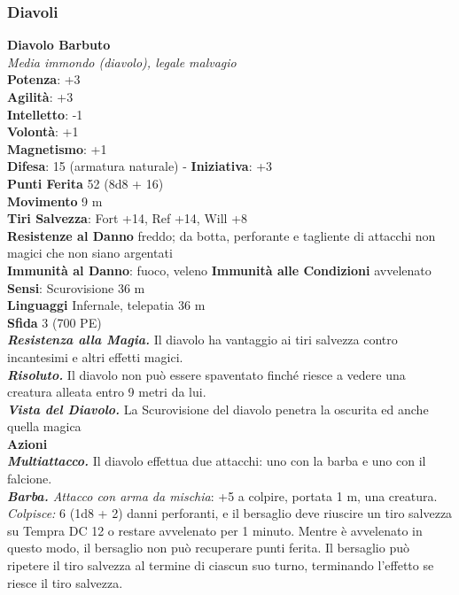 \begin{multicols}{2}
\subsubsection{Diavoli}

\medskip\textbf{Diavolo Barbuto}\\
\emph{Media immondo (diavolo), legale malvagio}\\
\textbf{Potenza}: +3\\
\textbf{Agilità}: +3\\
\textbf{Intelletto}: -1\\
\textbf{Volontà}: +1\\
\textbf{Magnetismo}: +1\\
\textbf{Difesa}: 15 (armatura naturale) - \textbf{Iniziativa}: +3\\
\textbf{Punti Ferita} 52 (8d8 + 16)\\
\textbf{Movimento} 9 m\\
\textbf{Tiri Salvezza}: Fort +14, Ref +14, Will +8\\
\textbf{Resistenze al Danno} freddo; da botta, perforante e tagliente di attacchi non magici che non siano argentati\\
\textbf{Immunità al Danno}: fuoco, veleno \textbf{Immunità alle Condizioni} avvelenato\\
\textbf{Sensi}: Scurovisione 36 m\\
\textbf{Linguaggi} Infernale, telepatia 36 m \\
\textbf{Sfida} 3 (700 PE)\smallskip\\
\emph{\textbf{Resistenza alla Magia.}} Il diavolo ha vantaggio ai tiri salvezza contro incantesimi e altri effetti magici.\\
\emph{\textbf{Risoluto.}} Il diavolo non può essere spaventato finché riesce a vedere una creatura alleata entro 9 metri da lui.\\
\emph{\textbf{Vista del Diavolo.}} La Scurovisione del diavolo penetra la oscurita ed anche quella magica\\
\smallskip\textbf{Azioni}\\
\emph{\textbf{Multiattacco.}} Il diavolo effettua due attacchi: uno con la barba e uno con il falcione.\\
\emph{\textbf{Barba.} Attacco con arma da mischia}: +5 a colpire, portata 1 m, una creatura.\\
\emph{Colpisce:} 6 (1d8 + 2) danni perforanti, e il bersaglio deve riuscire un tiro salvezza su Tempra DC 12 o restare avvelenato per 1 minuto. Mentre è avvelenato in questo modo, il bersaglio non può recuperare punti ferita. Il bersaglio può ripetere il tiro salvezza al termine di ciascun suo turno, terminando l'effetto se riesce il tiro salvezza.\\

\end{multicols}

